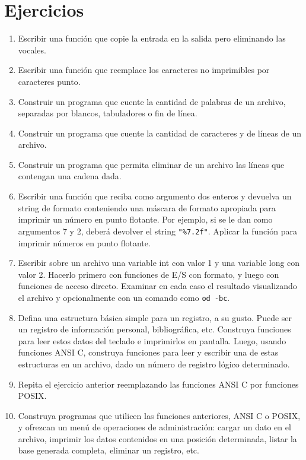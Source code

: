 \section{Ejercicios}
\begin{enumerate}
\item Escribir una función que copie la entrada en la salida pero eliminando las
vocales.
\item Escribir una función que reemplace los caracteres no imprimibles por
caracteres punto.
\item Construir un programa que cuente la cantidad de palabras de un archivo,
separadas por blancos, tabuladores o fin de línea.
\item Construir un programa que cuente la cantidad de caracteres y de líneas de un
archivo.
\item Construir un programa que permita eliminar de un archivo las líneas que
contengan una cadena dada.
\item Escribir una función que reciba como argumento dos enteros y devuelva un
string de formato conteniendo una máscara de formato apropiada para imprimir un
número en punto flotante. Por ejemplo, si se le dan como argumentos 7 y 2,
deberá devolver el string \lstinline{"%7.2f"}. Aplicar la función para imprimir números en
punto flotante.
\item Escribir sobre un archivo una variable int con valor 1 y una variable long
con valor 2. Hacerlo primero con funciones de E/S con formato, y luego con
funciones de acceso directo. Examinar en cada caso el resultado visualizando el
archivo y opcionalmente con un comando como \lstinline{od -bc}.
\item Defina una estructura básica simple para un registro, a su gusto. Puede ser
un registro de información personal, bibliográfica, etc. Construya funciones
para leer estos datos del teclado e imprimirlos en pantalla. Luego, usando
funciones ANSI C, construya funciones para leer y escribir una de estas
estructuras en un archivo, dado un número de registro lógico determinado.
\item Repita el ejercicio anterior reemplazando las funciones ANSI C por funciones
POSIX.
\item Construya programas que utilicen las funciones anteriores, ANSI C o POSIX,
y ofrezcan un menú de operaciones de administración: cargar un dato en el
archivo, imprimir los datos contenidos en una posición determinada, listar la
base generada completa, eliminar un registro, etc.
\end{enumerate}




